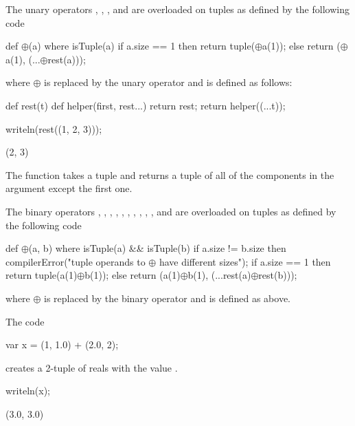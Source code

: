 The unary operators \chpl{\+}, \chpl{\-}, \chpl{\~}, and \chpl{\!} are
overloaded on tuples as defined by the following code
\begin{chapel}
def $\oplus$(a) where isTuple(a)
  if a.size == 1 then
    return tuple($\oplus$a(1));
  else
    return ($\oplus$a(1), (...$\oplus$rest(a)));
\end{chapel}
where $\oplus$ is replaced by the unary operator and  is
defined as follows:
\begin{chapelpre}
\end{chapelpre}
\begin{chapel}
def rest(t) {
  def helper(first, rest...)
    return rest;
  return helper((...t));
}
\end{chapel}
\begin{chapelpost}
writeln(rest((1, 2, 3)));
\end{chapelpost}
\begin{chapeloutput}
(2, 3)
\end{chapeloutput}

The  function takes a tuple and returns a tuple of all of
the components in the argument except the first one.

The binary operators \chpl{\+}, \chpl{\-}, \chpl{\*}, \chpl{\/}, \chpl{\%},
\chpl{\*\*}, \chpl{\&}, \chpl{\|}, \chpl{\^}, \chpl{\<\<}, and \chpl{\>\>}
are overloaded on tuples as defined by the following code
\begin{chapel}
def $\oplus$(a, b) where isTuple(a) && isTuple(b) {
  if a.size != b.size then
    compilerError("tuple operands to $\oplus$ have different sizes");
  if a.size == 1 then
    return tuple(a(1)$\oplus$b(1));
  else
    return (a(1)$\oplus$b(1), (...rest(a)$\oplus$rest(b)));
}
\end{chapel}
where $\oplus$ is replaced by the binary operator and  is
defined as above.

\begin{example}
\begin{chapelpre}
\end{chapelpre}
The code
\begin{chapel}
var x = (1, 1.0) + (2.0, 2);
\end{chapel}
creates a 2-tuple of reals with the value .
\begin{chapelpost}
writeln(x);
\end{chapelpost}
\begin{chapeloutput}
(3.0, 3.0)
\end{chapeloutput}
\end{example}


